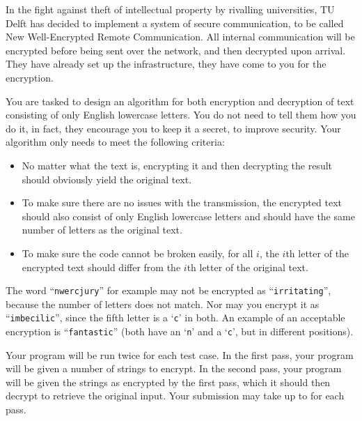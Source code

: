 \problemname{}


\newcommand{\maxn}{1000}
\newcommand{\maxlen}{100}

In the fight against theft of intellectual property by rivalling universities, TU Delft has decided to implement a system of secure communication, to be called New Well-Encrypted Remote Communication. All internal communication will be encrypted before being sent over the network, and then decrypted upon arrival. They have already set up the infra\-structure, they have come to you for the encryption.

You are tasked to design an algorithm for both encryption and decryption of text consisting of only English lowercase letters. You do not need to tell them how you do it, in fact, they encourage you to keep it a secret, to improve security. Your algorithm only needs to meet the following criteria:
\begin{itemize}
	\item No matter what the text is, encrypting it and then decrypting the result should obviously yield the original text.
	\item To make sure there are no issues with the transmission, the encrypted text should also consist of only English lowercase letters and should have the same number of letters as the original text.
	\item To make sure the code cannot be broken easily, for all $i$, the $i$th letter of the encrypted text should differ from the $i$th letter of the original text.
\end{itemize}

The word ``\texttt{nwercjury}'' for example may not be encrypted as ``\texttt{irritating}'', because the number of letters does not match. Nor may you encrypt it as ``\texttt{imbecilic}'', since the fifth letter is a `\texttt{c}' in both. An example of an acceptable encryption is ``\texttt{fantastic}'' (both have an `\texttt{n}' and a `\texttt{c}', but in different positions).

Your program will be run twice for each test case.
In the first pass, your program will be given a number of strings to encrypt.
In the second pass, your program will be given the strings as encrypted by
the first pass, which it should then decrypt to retrieve the original input.
\makeatletter
Your submission may take up to \ps@formattime{\timelimit} for each pass.
\makeatother

